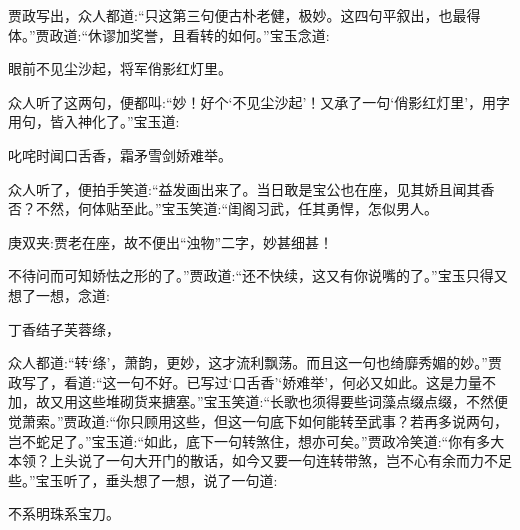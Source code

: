 \begin{parag}
    贾政写出，众人都道:“只这第三句便古朴老健，极妙。这四句平叙出，也最得体。”贾政道:“休谬加奖誉，且看转的如何。”宝玉念道:
\end{parag}


\begin{poem}
    \begin{pl}眼前不见尘沙起，将军俏影红灯里。\end{pl}

\end{poem}


\begin{parag}
    众人听了这两句，便都叫:“妙！好个‘不见尘沙起’！又承了一句‘俏影红灯里’，用字用句，皆入神化了。”宝玉道:
\end{parag}


\begin{poem}
    \begin{pl}叱咤时闻口舌香，霜矛雪剑娇难举。\end{pl}
\end{poem}


\begin{parag}
    众人听了，便拍手笑道:“益发画出来了。当日敢是宝公也在座，见其娇且闻其香否？不然，何体贴至此。”宝玉笑道:“闺阁习武，任其勇悍，怎似男人。\begin{note}庚双夹:贾老在座，故不便出“浊物”二字，妙甚细甚！\end{note}不待问而可知娇怯之形的了。”贾政道:“还不快续，这又有你说嘴的了。”宝玉只得又想了一想，念道:
\end{parag}


\begin{poem}
    \begin{pl}丁香结子芙蓉绦，\end{pl}
\end{poem}


\begin{parag}
    众人都道:“转‘绦’，萧韵，更妙，这才流利飘荡。而且这一句也绮靡秀媚的妙。”贾政写了，看道:“这一句不好。已写过‘口舌香’‘娇难举’，何必又如此。这是力量不加，故又用这些堆砌货来搪塞。”宝玉笑道:“长歌也须得要些词藻点缀点缀，不然便觉萧索。”贾政道:“你只顾用这些，但这一句底下如何能转至武事？若再多说两句，岂不蛇足了。”宝玉道:“如此，底下一句转煞住，想亦可矣。”贾政冷笑道:“你有多大本领？上头说了一句大开门的散话，如今又要一句连转带煞，岂不心有余而力不足些。”宝玉听了，垂头想了一想，说了一句道:
\end{parag}


\begin{poem}
    \begin{pl}不系明珠系宝刀。\end{pl}
\end{poem}



